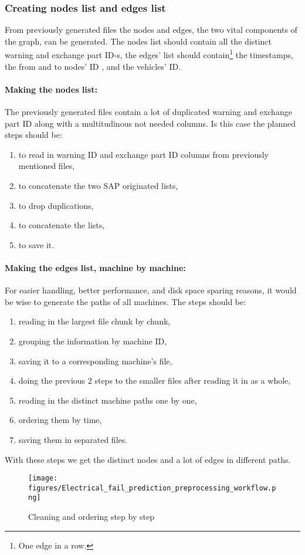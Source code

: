 		\subsubsection{Creating nodes list and edges list}
		From previously generated files the nodes and edges, the two vital components of the graph, can be generated. The nodes list should contain all the distinct warning and exchange part ID-s, the edges' list should contain\footnote{One edge in a row.} the timestamps, the from and to nodes' ID , and the vehicles' ID.
		\paragraph{Making the nodes list:}
		The previously generated files contain a lot of duplicated warning and exchange part ID along with a multitudinous not needed columns.
		Is this case the planned steps should be:
		\begin{enumerate}
			\item{to read in warning ID and exchange part ID columns from previously mentioned files,} 
			\item{to concatenate the two SAP originated lists,}
			\item{to drop duplications,}
			\item{to concatenate the lists,}
			\item{to save it.}
		 \end{enumerate}
		\paragraph{Making the edges list, machine by machine:}
		For easier handling, better performance, and disk space sparing reasons, it would be wise to generate the paths of all machines.
		The steps should be:
		\begin{enumerate}
			\item{reading in the largest file chunk by chunk,} 
			\item{grouping the information by machine ID,}
			\item{saving it to a corresponding machine's file,}
			\item{doing the previous 2 steps to the smaller files after reading it in as a whole,}
			\item{reading in the distinct machine paths one by one,}
			\item{ordering them by time,}
			\item{saving them in separated files.}
		 \end{enumerate}
		With these steps we get the distinct nodes and a lot of edges in different paths. 
		\begin{figure}[!ht]
		\centering
		\texttt{[image: figures/Electrical\_fail\_prediction\_preprocessing\_workflow.png]}
		\caption{Cleaning and ordering step by step} 
		\end{figure}
